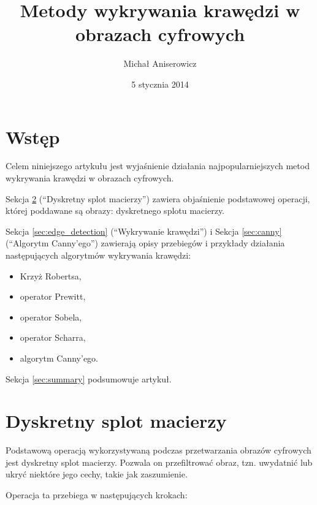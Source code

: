 \documentclass[a4paper,twocolumn,12pt]{article}
\title{Metody wykrywania krawędzi w obrazach cyfrowych}
\author{Michał Aniserowicz}
\date{5 stycznia 2014}
\begin{document}
\maketitle

\section{Wstęp}
Celem niniejszego artykułu jest wyjaśnienie działania najpopularniejszych metod wykrywania krawędzi w obrazach cyfrowych.

Sekcja \ref{sec:convolution} (``Dyskretny splot macierzy'') zawiera objaśnienie podstawowej operacji, której poddawane są obrazy: dyskretnego splotu macierzy.

Sekcja \ref{sec:edge_detection} (``Wykrywanie krawędzi'') i Sekcja \ref{sec:canny} (``Algorytm Canny'ego'') zawierają opisy przebiegów i przykłady działania następujących algorytmów wykrywania krawędzi:
\begin{itemize}
 \item Krzyż Robertsa,
 \item operator Prewitt,
 \item operator Sobela,
 \item operator Scharra,
 \item algorytm Canny'ego.
\end{itemize}

Sekcja \ref{sec:summary} podsumowuje artykuł.


\section{Dyskretny splot macierzy} \label{sec:convolution}

Podstawową operacją wykorzystywaną podczas przetwarzania obrazów cyfrowych jest dyskretny splot macierzy.
Pozwala on przefiltrować obraz, tzn. uwydatnić lub ukryć niektóre jego cechy, takie jak zaszumienie.

Operacja ta przebiega w następujących krokach:
\end{document}
